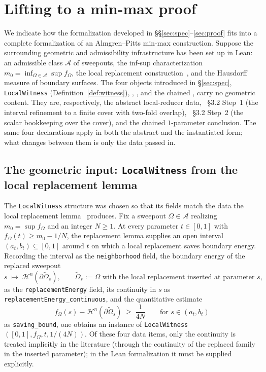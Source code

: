 \section{Lifting to a min-max proof}
\label{sec:integration}

We indicate how the formalization developed in
\S\S\ref{sec:spec}--\ref{sec:proof} fits into a complete
formalization of an Almgren--Pitts min-max construction.
Suppose the surrounding geometric and admissibility infrastructure
has been set up in Lean: an admissible class $\mathcal{A}$ of
sweepouts, the inf-sup characterization
$m_0 = \inf_{\Omega \in \mathcal{A}} \sup f_\Omega$, the local
replacement construction~\cite[Lemma~3.1]{DLT13}, and the
Hausdorff measure of boundary surfaces. The four objects
introduced in \S\ref{sec:spec},
\texttt{LocalWitness} (Definition~\ref{def:witness}),
,
, and the
chained ,
carry no geometric content. They are, respectively, the
abstract local-reducer data, \cite{DLT13}~\S3.2 Step~1
(the interval refinement to a finite cover with two-fold
overlap), \cite{DLT13}~\S3.2 Step~2 (the scalar bookkeeping
over the cover), and the chained $1$-parameter conclusion. The
same four declarations apply in both the abstract and the
instantiated form; what changes between them is only the
data passed in.

\subsection{The geometric input:
\texorpdfstring{\texttt{LocalWitness} from the local replacement lemma}{LocalWitness from the local replacement lemma}}
\label{sec:integration-input}

The \texttt{LocalWitness} structure was chosen so that its
fields match the data the local replacement
lemma~\cite[Lemma~3.1]{DLT13} produces. Fix a sweepout
$\Omega \in \mathcal{A}$ realizing $m_0 = \sup f_\Omega$ and an
integer $N \ge 1$. At every parameter $t \in [0,1]$ with
$f_\Omega(t) \ge m_0 - 1/N$, the replacement lemma supplies an
open interval $(a_t, b_t) \subseteq [0,1]$ around $t$ on which
a local replacement saves boundary energy. Recording the
interval as the \texttt{neighborhood} field, the boundary
energy of the replaced sweepout
\[
  s \;\longmapsto\; \mathcal{H}^n(\partial \widetilde{\Omega}_s),
  \qquad
  \widetilde{\Omega}_s := \text{$\Omega$ with the local
  replacement inserted at parameter $s$},
\]
as the \texttt{replacementEnergy} field, its continuity in $s$
as \texttt{replacementEnergy\_continuous}, and the quantitative
estimate
\[
  f_\Omega(s) - \mathcal{H}^n(\partial \widetilde{\Omega}_s)
  \;\ge\; \frac{1}{4N}
  \qquad \text{for } s \in (a_t, b_t)
\]
as \texttt{saving\_bound}, one obtains an instance of
\texttt{LocalWitness}\,$([0,1], f_\Omega, t, 1/(4N))$. Of these
four data items, only the continuity is treated implicitly in
the literature (through the continuity of the replaced family
in the inserted parameter); in the Lean formalization it must
be supplied explicitly.

